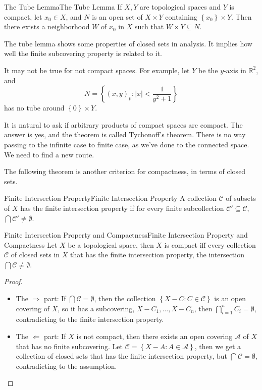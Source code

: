 \documentclass[../main.tex]{subfiles}
\begin{document}
\begin{lemma}{The Tube Lemma}{The Tube Lemma}
If $X,Y$ are topological spaces and $Y$ is compact, let $x_0\in X$, and $N$ is an open set of $X \times Y$ containing $\left\{ x_0 \right\}\times Y$. Then there exists a neighborhood $W$ of $x_0$ in $X$ such that $W \times Y \subseteq N$.
\end{lemma}

\begin{remark}
The tube lemma shows some properties of closed sets in analysis. It implies how well the finite subcovering property is related to it.

It may not be true for not compact spaces. For example, let $Y$ be the $y$-axis in $\mathbb{R}^2$, and 
\begin{equation*}
N = \left\{ (x,y)_p: \left|x\right| <\frac{1}{y^2+1} \right\}
\end{equation*}
has no tube around $\left\{ 0 \right\}\times Y$.
\end{remark}

It is natural to ask if arbitrary products of compact spaces are compact. The answer is yes, and the theorem is called Tychonoff's theorem. There is no way passing to the infinite case to finite case, as we've done to the connected space. We need to find a new route.

The following theorem is another criterion for compactness, in terms of closed sets.

\begin{definition}{Finite Intersection Property}{Finite Intersection Property}
	A collection $\mathcal{C}$ of subsets of $X$ has the finite intersection property if for every finite subcollection $\mathcal{C}' \subseteq \mathcal{C}$, $\bigcap \mathcal{C}' \neq \emptyset$.
\end{definition}

\begin{theorem}{Finite Intersection Property and Compactness}{Finite Intersection Property and Compactness}
	Let $X$ be a topological space, then $X$ is compact iff every collection $\mathcal{C}$ of closed sets in $X$ that has the finite intersection property, the intersection $\bigcap \mathcal{C} \neq \emptyset$.
\end{theorem}
\begin{proof}
\begin{itemize}
	\item The $\Rightarrow$ part: If $\bigcap \mathcal{C} = \emptyset $, then the collection $\left\{ X-C:C\in \mathcal{C} \right\}$ is an open covering of $X$, so it has a subcovering, $X-C_1, \ldots ,X-C_n$, then $\bigcap_{i=1}^{n} C_i = \emptyset$, contradicting to the finite intersection property.
	\item The $\Leftarrow$ part: If $X$ is not compact, then there exists an open covering $\mathcal{A}$ of $X$ that has no finite subcovering. Let $\mathcal{C} = \left\{ X-A: A\in \mathcal{A} \right\}$, then we get a collection of closed sets that has the finite intersection property, but $\bigcap \mathcal{C} = \emptyset$, contradicting to the assumption.
\end{itemize}
\end{proof}
\end{document}

